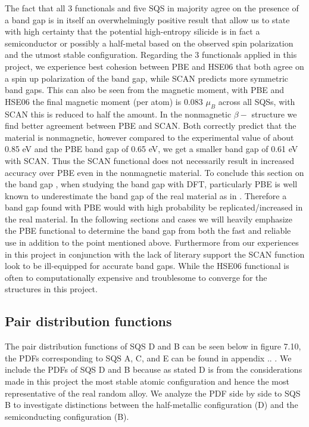The fact that all 3 functionals and five SQS in majority agree on the presence of a band gap is in itself an overwhelmingly positive result that allow us to state with high certainty that the potential high-entropy silicide  is in fact a semiconductor or possibly a half-metal based on the observed spin polarization and the utmost stable configuration. Regarding the 3 functionals applied in this project, we experience best cohesion between PBE and HSE06 that both agree on a spin up polarization of the band gap, while SCAN predicts more symmetric band gaps. This can also be seen from the magnetic moment, with PBE and HSE06 the final magnetic moment (per atom) is 0.083 $\mu_B$ across all SQSs, with SCAN this is reduced to half the amount. In the nonmagnetic $\beta-$  structure we find better agreement between PBE and SCAN. Both correctly predict that the material is nonmagnetic, however compared to the experimental value of about 0.85 eV and the PBE band gap of 0.65 eV, we get a smaller band gap of 0.61 eV with SCAN. Thus the SCAN functional does not necessarily result in increased accuracy over PBE even in the nonmagnetic material. To conclude this section on the band gap , when studying the band gap with DFT, particularly PBE is well known to underestimate the band gap of the real material as in . Therefore a band gap found with PBE would with high probability be replicated/increased in the real material. In the following sections and cases we will heavily emphasize the PBE functional to determine the band gap from both the fast and reliable use in addition to the point mentioned above. Furthermore from our experiences in this project in conjunction with the lack of literary support the SCAN function look to be ill-equipped for accurate band gaps. While the HSE06 functional is often to computationally expensive and troublesome to converge for the structures in this project.
 
\subsection{Pair distribution functions}
The pair distribution functions of SQS D and B can be seen below in figure 7.10, the PDFs corresponding to SQS A, C, and E can be found in appendix .. . We include the PDFs of SQS D and B because as stated D is from the considerations made in this project the most stable atomic configuration and hence the most representative of the real random alloy. We analyze the PDF side by side to SQS B to investigate distinctions between the half-metallic configuration (D) and the semiconducting configuration (B). 
 

